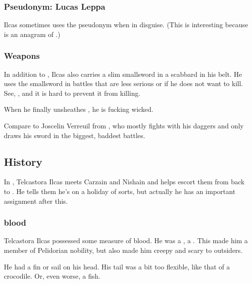 \subsubsection{Pseudonym: Lucas Leppa}
Ilcas sometimes uses the pseudonym  when \travelling in disguise. 
(This is interesting because  is an anagram of .)




\subsubsection{Weapons}
In addition to , Ilcas also carries a slim smallsword in a scabbard in his belt. 
He uses the smallsword in battles that are less serious or if he does not want to kill. 
See, , and it is hard to prevent it from killing. 

When he finally unsheathes \Telderain, he is fucking wicked. 

Compare to Joscelin Verreuil from \cite{JacquelineCarey:KushielsLegacy}, who mostly fights with his daggers and only draws his sword in the biggest, baddest battles. 









\subsection{History}
In , Telcastora Ilcas meets Carzain and Nishain and helps escort them from \Scyrum{} back to \Redglen. 
He tells them he's on a holiday of sorts, but actually he has an important assignment after this. 





\subsubsection{\Naga blood}
Telcastora Ilcas possessed some measure of \naga blood. 
He was a , a . 
This made him a member of Pelidorian nobility, but also made him creepy and scary to outsiders. 

He had a fin or sail on his head. 
His tail was a bit too flexible, like that of a crocodile. 
Or, even worse, a fish. 





